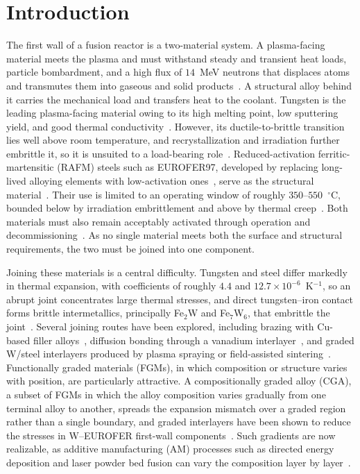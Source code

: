 \section{Introduction}

The first wall of a fusion reactor is a two-material system. A plasma-facing
material meets the plasma and must withstand steady and transient heat loads,
particle bombardment, and a high flux of \(14\)~MeV neutrons that displaces atoms
and transmutes them into gaseous and solid
products~\cite{linke2019pfc,knaster2016materials}. A structural alloy behind it
carries the mechanical load and transfers heat to the coolant. Tungsten is the
leading plasma-facing material owing to its high melting point, low sputtering
yield, and good thermal conductivity~\cite{tungstenPFMreview2023,rieth2013tungsten}.
However, its ductile-to-brittle transition lies well above room temperature, and
recrystallization and irradiation further embrittle it, so it is unsuited to a
load-bearing role~\cite{rieth2013tungsten}. Reduced-activation
ferritic-martensitic (RAFM) steels such as EUROFER97, developed by replacing
long-lived alloying elements with low-activation ones~\cite{ehrlich1994reduced},
serve as the structural material~\cite{lindau2005eurofer,RAFMreview2017}. Their
use is limited to an operating window of roughly \(350\)--\(550\)~\(^{\circ}\)C,
bounded below by irradiation embrittlement and above by thermal
creep~\cite{zinkle2000operating}. Both materials must also remain acceptably
activated through operation and decommissioning~\cite{bloom2007critical}. As no
single material meets both the surface and structural requirements, the two must
be joined into one component.

Joining these materials is a central difficulty. Tungsten and steel differ
markedly in thermal expansion, with coefficients of roughly \(4.4\) and
\(12.7 \times 10^{-6}\)~K\(^{-1}\), so an abrupt joint concentrates large thermal
stresses, and direct tungsten--iron contact forms brittle intermetallics,
principally Fe\(_2\)W and Fe\(_7\)W\(_6\), that embrittle the
joint~\cite{fgmWsteelCGS2022,karim2024wire}. Several joining routes have been
explored, including brazing with Cu-based filler alloys~\cite{bachurina2019brazing},
diffusion bonding through a vanadium interlayer~\cite{basuki2015vanadium}, and graded
W/steel interlayers produced by plasma spraying or field-assisted
sintering~\cite{heuer2019aps,heuer2019sintered,ganesh2021joint}. Functionally graded
materials (FGMs), in which composition or structure varies with position, are
particularly attractive. A compositionally graded alloy (CGA), a subset of FGMs in
which the alloy composition varies gradually from one terminal alloy to another,
spreads the expansion mismatch over a graded region rather than a single boundary,
and graded interlayers have been shown to reduce the stresses in W--EUROFER
first-wall components~\cite{fgmWEurofer2015,heuer2018eurofer}. Such gradients are
now realizable, as additive manufacturing (AM) processes such as
directed energy deposition and laser powder bed fusion can vary the composition
layer by layer~\cite{karim2024wire,lee2024lpbf}.

